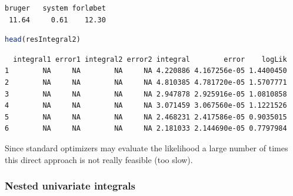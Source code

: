 \documentclass[12pt]{article}
\begin{document}
\label{}
\begin{verbatim}
bruger   system forløbet 
 11.64     0.61    12.30
\end{verbatim}


\begin{lstlisting}[language=r,numbers=none]
head(resIntegral2)
\end{lstlisting}

\label{}
\begin{verbatim}
  integral1 error1 integral2 error2 integral        error    logLik
1        NA     NA        NA     NA 4.220886 4.167256e-05 1.4400450
2        NA     NA        NA     NA 4.810385 4.781720e-05 1.5707771
3        NA     NA        NA     NA 2.947878 2.925916e-05 1.0810858
4        NA     NA        NA     NA 3.071459 3.067560e-05 1.1221526
5        NA     NA        NA     NA 2.468231 2.417586e-05 0.9035015
6        NA     NA        NA     NA 2.181033 2.144690e-05 0.7797984
\end{verbatim}


Since standard optimizers may evaluate the likelihood a large number
of times this direct approach is not really feasible (too slow).
\subsubsection{Nested univariate integrals}
\label{sec:org87f99ca}
\end{document}
